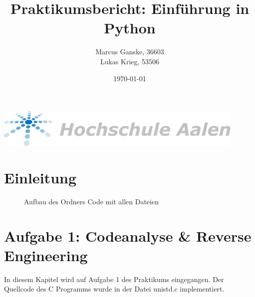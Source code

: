 \documentclass[12pt]{article}
\title{Praktikumsbericht: Einf\"uhrung in Python}
\author{Marcus Ganske, 36603\\
		Lukas Krieg, 53506}
\date{\today}
\begin{document}
\maketitle
\vspace{+8cm}{
}
\includegraphics[width=12cm]{Hochschule-aalen.pdf}

\newpage
\renewcommand\contentsname{Inhaltsverzeichnis}
\tableofcontents
\newpage
	
	\section{Einleitung}
	\begin{figure}[H]
	
		\caption{Aufbau des Ordners Code mit allen Dateien}
	\end{figure}	


\newpage
\section{Aufgabe 1: Codeanalyse \& Reverse Engineering}
In diesem Kapitel wird auf Aufgabe 1 des Praktikums eingegangen.
Der Quellcode des C Programms wurde in der Datei unistd.c implementiert.
\end{document}
